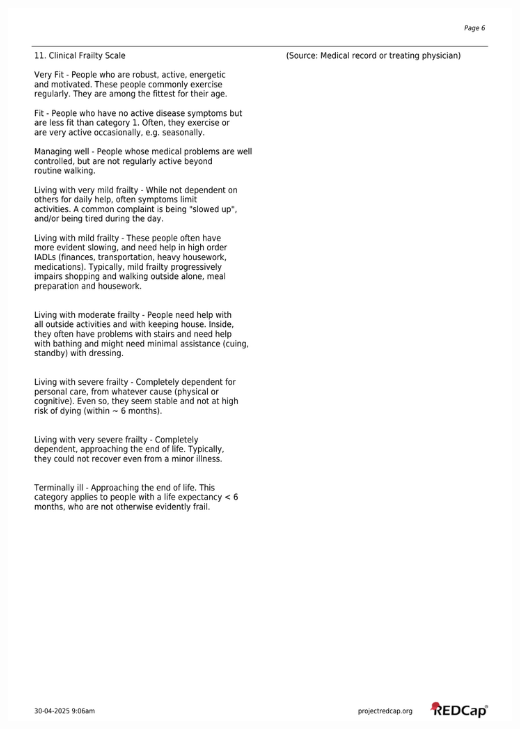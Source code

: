 \documentclass[
]{scrartcl}
\begin{document}
\includegraphics{../case-record-form/instrument-pdfs/pages/all-instruments-6.pdf}
\end{document}
